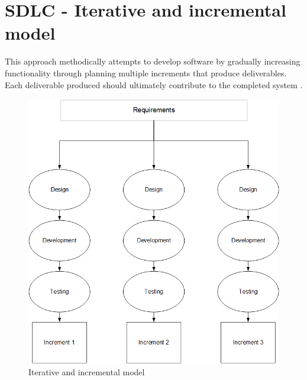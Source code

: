 \section{SDLC - Iterative and incremental model}

This approach methodically attempts to develop software by gradually increasing functionality through planning multiple increments that produce deliverables. Each deliverable produced should ultimately contribute to the completed system \citep{IterativeModel}. 


    
    \begin{figure}[htbp!] 
    \centering    
    \includegraphics[width=1.0\textwidth]{Chapter3/Figs/Figure3-1.png}
    \caption[Iterative and incremental model]{Iterative and incremental model}
    \label{fig:Iterative and incremental model}
    \end{figure}
    
